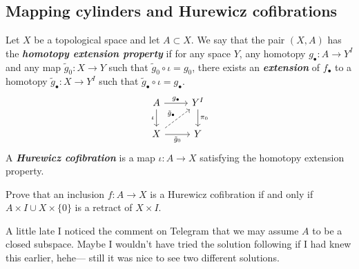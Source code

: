 \documentclass{article}
\numberwithin{equation}{section}
\begin{document}
\subsection{Mapping cylinders and Hurewicz cofibrations}
\begin{defn}
	Let $X$ be a topological space and let $A\subset X$. We say that the pair $(X,A)$ has the \textbf{\textit{homotopy extension property}} if for any space $Y$, any homotopy $g_\bullet:A\to Y^I$ and any map $\tilde{g}_0:X\to Y$ such that $\tilde{g}_0\circ\iota=g_0$, there exists an \textbf{\textit{extension}} of $f_\bullet$ to a homotopy $\tilde{g}_\bullet:X\to Y^I$ such that $\tilde{g}_\bullet\circ\iota=g_\bullet$.
	\[\begin{tikzcd}
		A\arrow[r,"g_\bullet"]\arrow[d,swap,"\iota"]&Y^I\arrow[d,"\pi_0"]\\
		X\arrow[ur,dashed,"\tilde{g}_\bullet"]\arrow[r,swap,"\tilde{g}_0"]&Y
	\end{tikzcd}\]
	A \textbf{\textit{Hurewicz cofibration}} is a map $\iota:A\to X$ satisfying the homotopy extension property.
\end{defn}
\begin{exercise}[a] Prove that an inclusion $f:A\to X$ is a Hurewicz cofibration if and only if $A\times I\cup X\times \{0\}$ is a retract of $X\times I$.
\end{exercise}
\begin{remark}
	A little late I noticed the comment on Telegram that we may assume $A$ to be a closed subspace. Maybe I wouldn't have tried the solution following \cite{lectures} if I had knew this earlier, hehe--- still it was nice to see two different solutions.
\end{remark}
\end{document}
